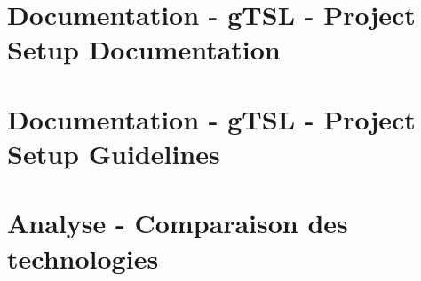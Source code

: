 \documentclass{tnreport}
\begin{document}
\chapter{Documentation - gTSL - Project Setup Documentation}
\label{anx:gtsl-setup}

\clearpage

\chapter{Documentation - gTSL - Project Setup Guidelines}
\label{anx:gtsl-guidelines}

\clearpage

\chapter{Analyse - Comparaison des technologies}
\label{anx:comparison}
\end{document}
